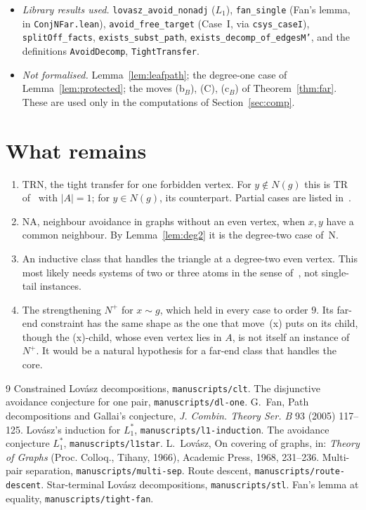 \documentclass[11pt]{amsart}
\theoremstyle{definition}
\newcommand{\TRN}{\mathrm{TRN}}
\begin{document}
\begin{itemize}
\item \emph{Library results used.} \texttt{lovasz\_avoid\_nonadj} ($L_1$), \texttt{fan\_single}
(Fan's lemma, in \texttt{ConjNFar.lean}),
\texttt{avoid\_free\_target} (Case~I, via \texttt{csys\_caseI}), \texttt{splitOff\_facts},
\texttt{exists\_subst\_path}, \texttt{exists\_decomp\_of\_edgesM'}, and the definitions
\texttt{AvoidDecomp}, \texttt{TightTransfer}.
\item \emph{Not formalised.} Lemma~\ref{lem:leafpath}; the degree-one case of
Lemma~\ref{lem:protected}; the moves (b$_B$), (C), (c$_B$) of Theorem~\ref{thm:far}. These are
used only in the computations of Section~\ref{sec:comp}.
\end{itemize}

\section{What remains}\label{sec:open}
\begin{enumerate}
\item $\TRN$, the tight transfer for one forbidden vertex. For $y\notin N(g)$ this is TR
of~\cite{L1I} with $|A|=1$; for $y\in N(g)$, its counterpart. Partial cases are listed
in~\cite[\S4.1]{L1I}.
\item NA, neighbour avoidance in graphs without an even vertex, when $x,y$ have a common
neighbour. By Lemma~\ref{lem:deg2} it is the degree-two case of~N.
\item An inductive class that handles the triangle at a degree-two even vertex. This most likely
needs systems of two or three atoms in the sense of~\cite{CLT}, not single-tail instances.
\item The strengthening $N^+$ for $x\sim g$, which held in every case to order $9$. Its far-end
constraint has the same shape as the one that move~(x) puts on its child, though the (x)-child,
whose even vertex lies in $A$, is not itself an instance of $N^+$. It would be a natural hypothesis for a far-end class that
handles the core.
\end{enumerate}

\begin{thebibliography}{9}
 Constrained Lov\'asz decompositions, \texttt{manuscripts/clt}.
 The disjunctive avoidance conjecture for one pair, \texttt{manuscripts/dl-one}.
 G.~Fan, Path decompositions and Gallai's conjecture, \emph{J. Combin. Theory Ser.
B} 93 (2005) 117--125.
 Lov\'asz's induction for $L_1^*$, \texttt{manuscripts/l1-induction}.
 The avoidance conjecture $L_1^*$, \texttt{manuscripts/l1star}.
 L.~Lov\'asz, On covering of graphs, in: \emph{Theory of Graphs} (Proc. Colloq.,
Tihany, 1966), Academic Press, 1968, 231--236.
 Multi-pair separation, \texttt{manuscripts/multi-sep}.
 Route descent, \texttt{manuscripts/route-descent}.
 Star-terminal Lov\'asz decompositions, \texttt{manuscripts/stl}.
 Fan's lemma at equality, \texttt{manuscripts/tight-fan}.
\end{thebibliography}
\end{document}
